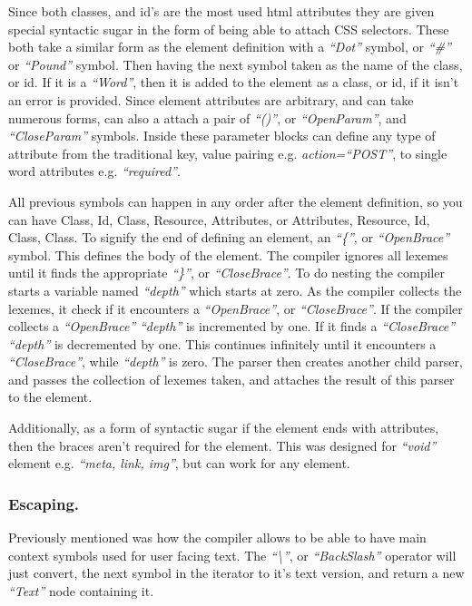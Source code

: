 Since both classes, and id's are the most used html attributes they are given special syntactic sugar in the form of being able to attach CSS selectors. These both take a similar form as the element definition with a \textit{``Dot''} symbol, or \textit{``\#''} or \textit{``Pound''} symbol. Then having the next symbol taken as the name of the class, or id. If it is a \textit{``Word''}, then it is added to the element as a class, or id, if it isn't an error is provided.
Since element attributes are arbitrary, and can take numerous forms, \you{} can also a attach a pair of \textit{``()''}, or \textit{``OpenParam''}, and \textit{``CloseParam''} symbols. Inside these parameter blocks \you{} can define any type of attribute from the traditional key, value pairing e.g. \textit{action=``POST''}, to single word attributes e.g. \textit{``required''}.

All previous symbols can happen in any order after the element definition, so you can have  Class, Id, Class, Resource, Attributes, or Attributes, Resource, Id, Class, Class. To signify the end of defining an element, an \textit{``\{''}, or \textit{``OpenBrace''} symbol. This defines the body of the element. The compiler ignores all lexemes until it finds the appropriate \textit{``\}''}, or \textit{``CloseBrace''}. To do nesting the compiler starts a variable named \textit{``depth''} which starts at zero.
\newpage
As the compiler collects the lexemes, it check if it encounters a \textit{``OpenBrace''}, or \textit{``CloseBrace''}. If the compiler collects a \textit{``OpenBrace''} \textit{``depth''} is incremented by one. If it finds a \textit{``CloseBrace''} \textit{``depth''} is decremented by one. This continues  infinitely until it encounters a \textit{``CloseBrace''}, while \textit{``depth''} is zero. The parser then creates another child parser, and passes the collection of lexemes taken, and attaches the result of this parser to the element.

Additionally, as a form of syntactic sugar if the element ends with attributes, then the braces aren't required for the element. This was designed for \textit{``void''} element e.g. \textit{``meta, link, img''}, but can work for any element.

\subsubsection{Escaping.}
Previously mentioned was how the compiler allows \you{} to be able to have main context symbols used for user facing text. The \textit{``\textbackslash''}, or \textit{``BackSlash''} operator will just convert, the next symbol in the iterator to it's text version, and return a new \textit{``Text''} node containing it.

